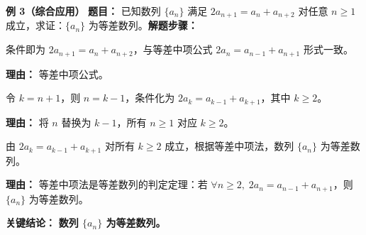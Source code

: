 \begin{examplebox}
	\medskip
	\textbf{\textcolor{CExample}{例 3（综合应用）}}
	\textbf{\textcolor{CExample}{题目：}} 已知数列 $\{a_n\}$ 满足 $2a_{n+1}=a_n+a_{n+2}$ 对任意 $n\ge 1$ 成立，求证：$\{a_n\}$ 为等差数列。\textbf{\textcolor{CExample}{解题步骤：}}
	\begin{description}[style=nextline, leftmargin=2.8em, labelsep=0.5em, itemsep=0.45em]
		\item[\textbf{第一步（改写条件）：}]
			条件即为 $2a_{n+1}=a_n+a_{n+2}$，与等差中项公式 $2a_n = a_{n-1}+a_{n+1}$ 形式一致。
			\par\textbf{理由：} 等差中项公式。
		\item[\textbf{第二步（变量替换）：}]
			令 $k=n+1$，则 $n=k-1$，条件化为 $2a_k = a_{k-1}+a_{k+1}$，其中 $k\ge 2$。
			\par\textbf{理由：} 将 $n$ 替换为 $k-1$，所有 $n\ge 1$ 对应 $k\ge 2$。
		\item[\textbf{第三步（判定等差）：}]
			由 $2a_k = a_{k-1}+a_{k+1}$ 对所有 $k\ge 2$ 成立，根据等差中项法，数列 $\{a_n\}$ 为等差数列。
			\par\textbf{理由：} 等差中项法是等差数列的判定定理：若 $\forall n\ge 2,\;2a_n=a_{n-1}+a_{n+1}$，则 $\{a_n\}$ 为等差数列。
	\end{description}
	\textbf{\textcolor{CExample}{关键结论：}}
	\textbf{数列 $\{a_n\}$ 为等差数列。}
\end{examplebox}
